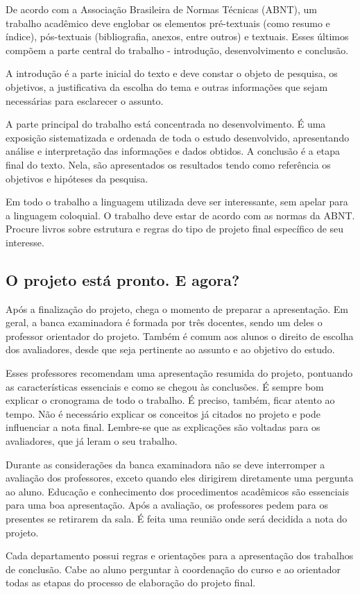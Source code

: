 De acordo com a Associação Brasileira de Normas Técnicas (ABNT), um trabalho acadêmico deve englobar os elementos pré-textuais (como resumo e índice), pós-textuais (bibliografia, anexos, entre outros) e textuais. Esses últimos compõem a parte central do trabalho - introdução, desenvolvimento e conclusão.

A introdução é a parte inicial do texto e deve constar o objeto de pesquisa, os objetivos, a justificativa da escolha do tema e outras informações que sejam necessárias para esclarecer o assunto.

A parte principal do trabalho está concentrada no desenvolvimento. É uma exposição sistematizada e ordenada de toda o estudo desenvolvido, apresentando análise e interpretação das informações e dados obtidos. A conclusão é a etapa final do texto. Nela, são apresentados os resultados tendo como referência os objetivos e hipóteses da pesquisa.

Em todo o trabalho a linguagem utilizada deve ser interessante, sem apelar para a linguagem coloquial. O trabalho deve estar de acordo com as normas da ABNT. Procure livros sobre estrutura e regras do tipo de projeto final específico de seu interesse.

\subsection{O projeto está pronto. E agora?}
Após a finalização do projeto, chega o momento de preparar a apresentação. Em geral, a banca examinadora é formada por três docentes, sendo um deles o professor orientador do projeto. Também é comum aos alunos o direito de escolha dos avaliadores, desde que seja pertinente ao assunto e ao objetivo do estudo.

Esses professores recomendam uma apresentação resumida do projeto, pontuando as características essenciais e como se chegou às conclusões. É sempre bom explicar o cronograma de todo o trabalho. É preciso, também, ficar atento ao tempo. Não é necessário explicar os conceitos já citados no projeto e pode influenciar a nota final. Lembre-se que as explicações são voltadas para os avaliadores, que já leram o seu trabalho.

Durante as considerações da banca examinadora não se deve interromper a avaliação dos professores, exceto quando eles dirigirem diretamente uma pergunta ao aluno. Educação e conhecimento dos procedimentos acadêmicos são essenciais para uma boa apresentação. Após a avaliação, os professores pedem para os presentes se retirarem da sala. É feita uma reunião onde será decidida a nota do projeto.

Cada departamento possui regras e orientações para a apresentação dos trabalhos de conclusão. Cabe ao aluno perguntar à coordenação do curso e ao orientador todas as etapas do processo de elaboração do projeto final.

\selectfont%
